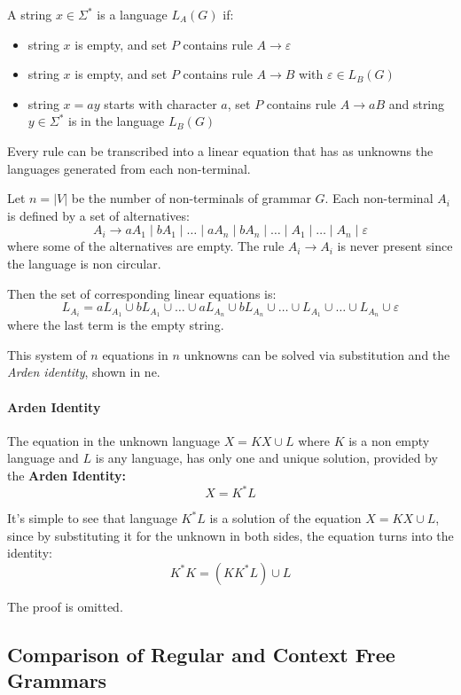 \documentclass[english]{article}
\begin{document}
A string \(x \in \Sigma^\ast\) is a language \(L_A(G)\) if:

\begin{itemize}
  \item string \(x\) is empty, and set \(P\) contains rule \(A \rightarrow \varepsilon\)
  \item string \(x\) is empty, and set \(P\) contains rule \(A \rightarrow B\) with \(\varepsilon \in L_B(G)\)
  \item string \(x = ay\) starts with character \(a\), set \(P\) contains rule \(A \rightarrow aB\) and string \(y \in \Sigma^\ast\) is in the language \(L_B(G)\)
\end{itemize}

Every rule can be transcribed into a linear equation that has as unknowns the languages generated from each non-terminal.

Let \(n = |V|\) be the number of non-terminals of grammar \(G\).
Each non-terminal \(A_i\) is defined by a set of alternatives:
\[ A_i \rightarrow a A_1 \mid b A_1 \mid \ldots \mid a A_n \mid b A_n \mid \ldots \mid A_1 \mid \ldots \mid A_n \mid \varepsilon \]
where some of the alternatives are empty. The rule \(A_i \rightarrow A_i\) is never present since the language is non circular.

Then the set of corresponding linear equations is:
\[ L_{A_i} = a L_{A_1} \cup b L_{A_1} \cup \ldots \cup a L_{A_n} \cup b L_{A_n} \cup \ldots \cup L_{A_1} \cup \ldots \cup L_{A_n} \cup \varepsilon \]
where the last term is the empty string.

This system of \(n\) equations in \(n\) unknowns can be solved via substitution and the \textit{Arden identity}, shown in ne.

\paragraph{Arden Identity}

The equation in the unknown language \(X= K X \cup L\) where \(K\) is a non empty language and \(L\) is any language, has only one and unique solution, provided by the \textbf{Arden Identity:}
\[ X = K^\ast L \]

It's simple to see that language \(K^\ast L\) is a solution of the equation \(X = K X \cup L\), since by substituting it for the unknown in both sides, the equation turns into the identity:
\[ K^\ast K = (K K^\ast L) \cup L \]

\bigskip
The proof is omitted.

\subsection{Comparison of Regular and Context Free Grammars}
\end{document}
